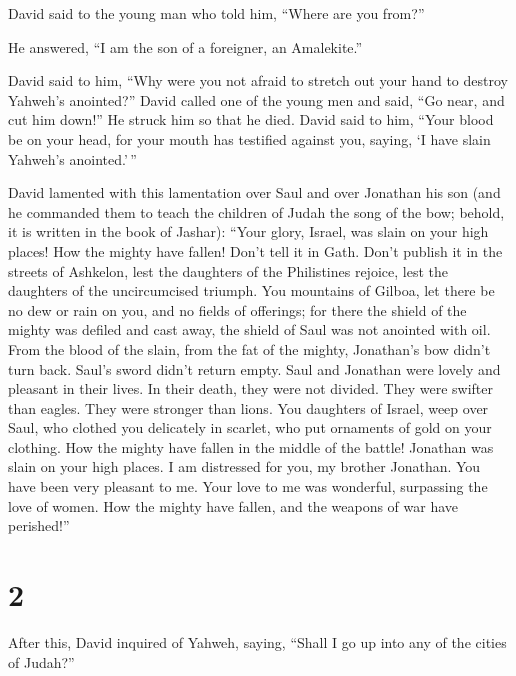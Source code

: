  David said to the young man who told him, ``Where are
you from?''

He answered, ``I am the son of a foreigner, an Amalekite.''

 David said to him, ``Why were you not afraid to stretch
out your hand to destroy Yahweh's anointed?''  David
called one of the young men and said, ``Go near, and cut him down!'' He
struck him so that he died.  David said to him, ``Your
blood be on your head, for your mouth has testified against you, saying,
`I have slain Yahweh's anointed.'\,''

 David lamented with this lamentation over Saul and over
Jonathan his son  (and he commanded them to teach the
children of Judah the song of the bow; behold, it is written in the book
of Jashar):  ``Your glory, Israel, was slain on your high
places! How the mighty have fallen!  Don't tell it in
Gath. Don't publish it in the streets of Ashkelon, lest the daughters of
the Philistines rejoice, lest the daughters of the uncircumcised
triumph.  You mountains of Gilboa, let there be no dew or
rain on you, and no fields of offerings; for there the shield of the
mighty was defiled and cast away, the shield of Saul was not anointed
with oil.  From the blood of the slain, from the fat of
the mighty, Jonathan's bow didn't turn back. Saul's sword didn't return
empty.  Saul and Jonathan were lovely and pleasant in
their lives. In their death, they were not divided. They were swifter
than eagles. They were stronger than lions.  You
daughters of Israel, weep over Saul, who clothed you delicately in
scarlet, who put ornaments of gold on your clothing.  How
the mighty have fallen in the middle of the battle! Jonathan was slain
on your high places.  I am distressed for you, my brother
Jonathan. You have been very pleasant to me. Your love to me was
wonderful, surpassing the love of women.  How the mighty
have fallen, and the weapons of war have perished!''

\hypertarget{section-1}{%
\section{2}\label{section-1}}

 After this, David inquired of Yahweh, saying, ``Shall I
go up into any of the cities of Judah?''

